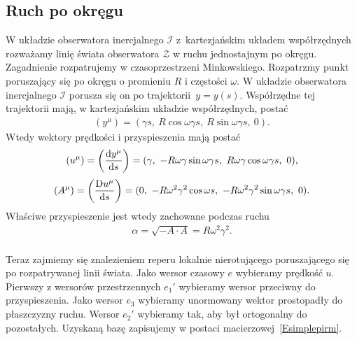 \subsection{Ruch po okręgu}
W układzie obserwatora inercjalnego $\mathcal{I}$ z~kartezjańskim 
układem współrzędnych rozważamy linię świata 
obserwatora $\mathcal{Z}$ w ruchu jednostajnym po okręgu.
Zagadnienie rozpatrujemy w czasoprzestrzeni Minkowskiego.
Rozpatrzmy punkt poruszający się po okręgu o promieniu $R$ i 
częstości $\omega$. W układzie
obserwatora inercjalnego $\mathcal{I}$ porusza się on po 
trajektorii~$y=y(s)$. Współrzędne tej trajektorii mają, w kartezjańskim 
układzie współrzędnych, postać
\begin{align*}
(y^\mu) = (\gamma s,\ R\cos\omega\gamma s,\ R\sin\omega\gamma s,\ 0).
\end{align*}
Wtedy wektory prędkości i przyspieszenia mają postać
\begin{align*}
(u^\mu) = \left( \frac{\text{d} y^\mu}{\text{d} s} \right) 
= (\gamma,\ -R\omega\gamma\sin\omega\gamma s,
\ R\omega\gamma\cos\omega\gamma s,\ 0),
\end{align*}
\begin{align*}
(A^\mu) = \left( \frac{\text{D} u^\mu}{\text{d} s}\right) 
= (0,\ -R\omega^2\gamma^2\cos\omega s
,\ -R\omega^2\gamma^2\sin\omega\gamma s,\ 0).
\end{align*}
Właściwe przyspieszenie jest wtedy zachowane podczas ruchu
\begin{align*}
\alpha =\sqrt{ - A\cdot A} =  R\omega^2\gamma^2 .
\end{align*}
\\
%
Teraz zajmiemy się znalezieniem reperu lokalnie nierotującego
poruszającego się po rozpatrywanej linii świata.
Jako wersor czasowy $e$ wybieramy prędkość $u$. 
Pierwszy z wersorów przestrzennych $e_1'$ wybieramy 
wersor przeciwny do przyspieszenia.
Jako wersor $e_3$ wybieramy unormowany wektor 
prostopadły do płaszczyzny ruchu.
Wersor $e_2'$ wybieramy tak, aby był ortogonalny do pozostałych. 
Uzyskaną bazę zapisujemy w postaci macierzowej~\eqref{Esimplepirm}.
